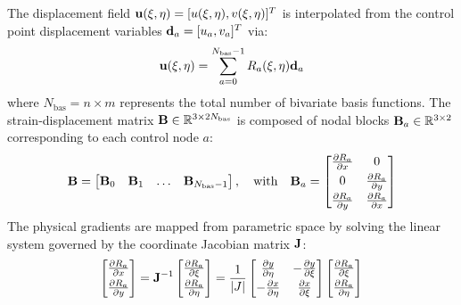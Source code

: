 The displacement field $\mathbf{u}(\xi, \eta) = [u(\xi, \eta), v(\xi, \eta)]^T$ is interpolated from the control point displacement variables $\mathbf{d}_a = [u_a, v_a]^T$ via:
\begin{equation}
        \mathbf{u}(\xi, \eta) = \sum_{a=0}^{N_{\text{bas}}-1} R_a(\xi, \eta) \mathbf{d}_a
\end{equation}
where $N_{\text{bas}} = n \times m$ represents the total number of bivariate basis functions. The strain-displacement matrix $\mathbf{B} \in \mathbb{R}^{3 \times 2N_{\text{bas}}}$ is composed of nodal blocks $\mathbf{B}_a \in \mathbb{R}^{3 \times 2}$ corresponding to each control node $a$:
\begin{equation}
        \mathbf{B} = \begin{bmatrix} \mathbf{B}_0 & \mathbf{B}_1 & \dots & \mathbf{B}_{N_{\text{bas}}-1} \end{bmatrix}, \quad \text{with} \quad \mathbf{B}_a = \begin{bmatrix} \frac{\partial R_a}{\partial x} & 0 \\[0.3em] 0 & \frac{\partial R_a}{\partial y} \\[0.3em] \frac{\partial R_a}{\partial y} & \frac{\partial R_a}{\partial x} \end{bmatrix}
\end{equation}
The physical gradients are mapped from parametric space by solving the linear system governed by the coordinate Jacobian matrix $\mathbf{J}$:
\begin{equation}
        \begin{bmatrix} \frac{\partial R_a}{\partial x} \\[0.3em] \frac{\partial R_a}{\partial y} \end{bmatrix} = \mathbf{J}^{-1} \begin{bmatrix} \frac{\partial R_a}{\partial \xi} \\[0.3em] \frac{\partial R_a}{\partial \eta} \end{bmatrix} = \frac{1}{|J|} \begin{bmatrix} \frac{\partial y}{\partial \eta} & -\frac{\partial y}{\partial \xi} \\[0.3em] -\frac{\partial x}{\partial \eta} & \frac{\partial x}{\partial \xi} \end{bmatrix} \begin{bmatrix} \frac{\partial R_a}{\partial \xi} \\[0.3em] \frac{\partial R_a}{\partial \eta} \end{bmatrix}
\end{equation}

